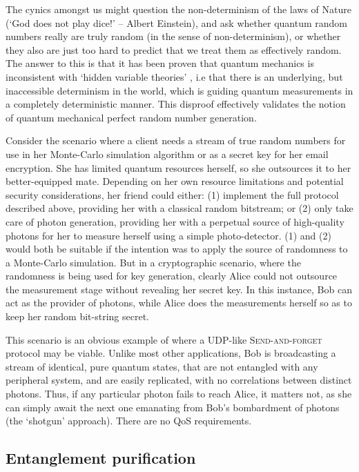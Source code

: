 The cynics amongst us might question the non-determinism of the laws of Nature (`God does not play dice!' -- Albert Einstein), and ask whether quantum random numbers really are truly random (in the sense of non-determinism), or whether they also are just too hard to predict that we treat them as effectively random. The answer to this is that it has been proven that quantum mechanics is inconsistent with `hidden variable theories' \cite{Bell}, i.e that there is an underlying, but inaccessible determinism in the world, which is guiding quantum measurements in a completely deterministic manner. This disproof effectively validates the notion of quantum mechanical perfect random number generation.

Consider the scenario where a client needs a stream of true random numbers for use in her Monte-Carlo simulation algorithm or as a secret key for her email encryption. She has limited quantum resources herself, so she outsources it to her better-equipped mate. Depending on her own resource limitations and potential security considerations, her friend could either: (1) implement the full protocol described above, providing her with a classical random bitstream; or (2) only take care of photon generation, providing her with a perpetual source of high-quality photons for her to measure herself using a simple photo-detector. (1) and (2) would both be suitable if the intention was to apply the source of randomness to a Monte-Carlo simulation. But in a cryptographic scenario, where the randomness is being used for key generation, clearly Alice could not outsource the measurement stage without revealing her secret key. In this instance, Bob can act as the provider of photons, while Alice does the measurements herself so as to keep her random bit-string secret.

This scenario is an obvious example of where a UDP-like \textsc{Send-and-forget} protocol may be viable. Unlike most other applications, Bob is broadcasting a stream of identical, pure quantum states, that are not entangled with any peripheral system, and are easily replicated, with no correlations between distinct photons. Thus, if any particular photon fails to reach Alice, it matters not, as she can simply await the next one emanating from Bob's bombardment of photons (the `shotgun' approach). There are no QoS requirements.

%
%

\subsection{Entanglement purification} \label{sec:ent_purif} 

